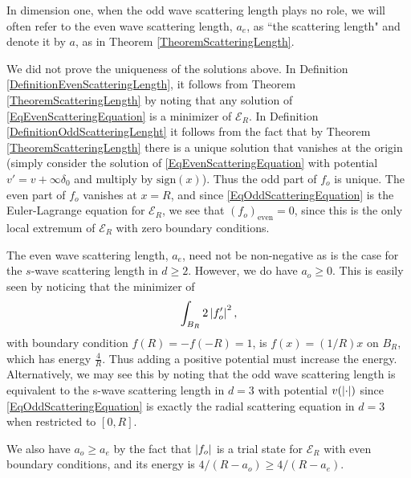 \begin{remark}
	In dimension one, when the odd wave scattering length plays no role, we will often refer to the even wave scattering length, $a_e$, as ``the scattering length" and denote it by $a$, as in Theorem \ref{TheoremScatteringLength}.
\end{remark}
\begin{remark}
	We did not prove the uniqueness of the solutions above. In Definition \ref{DefinitionEvenScatteringLength}, it follows from Theorem \ref{TheoremScatteringLength} by noting that any solution of \eqref{EqEvenScatteringEquation} is a minimizer of $ \mathcal{E}_R $. In Definition \ref{DefinitionOddScatteringLenght} it follows from the fact that by Theorem \ref{TheoremScatteringLength} there is a unique solution that vanishes at the origin (simply consider the solution of \eqref{EqEvenScatteringEquation} with potential $ v'=v+\infty \delta_0 $ and multiply by $ \text{sign}(x) $). Thus the odd part of $ f_o $ is unique. The even part of $ f_o $ vanishes at $ x=R $, and since \eqref{EqOddScatteringEquation} is the Euler-Lagrange equation for $ \mathcal{E}_R $, we see that $ (f_o)_{\text{even}}=0 $, since this is the only local extremum of $ \mathcal{E}_R $ with zero boundary conditions.
\end{remark}
\begin{remark}
	The even wave scattering length, $ a_e $, need not be non-negative as is the case for the $ s $-wave scattering length in $ d\geq 2 $. However, we do have $ a_o\geq 0 $. This is easily seen by noticing that the minimizer of \begin{equation}
	\int_{B_R} 2\left\lvert f_o' \right\rvert^2,
	\end{equation}
	with boundary condition $ f(R)=-f(-R)=1 $, is $ f(x)=(1/R) x $ on $ B_R $, which has energy $ \frac{4}{R} $. Thus adding a positive potential must increase the energy. \\
	Alternatively, we may see this by noting that the odd wave scattering length is equivalent to the s-wave scattering length in $ d=3 $ with potential $ v(\left\lvert \cdot \right\rvert) $ since 
	\eqref{EqOddScatteringEquation} is exactly the radial scattering equation in $ d=3 $ when restricted to $ [0,R] $.
\end{remark}
\begin{remark}
	We also have $ a_o\geq a_e $ by the fact that $ \left\lvert f_o \right\rvert $ is a trial state for $ \mathcal{E}_R $ with even boundary conditions, and its energy is $ 4/(R-a_o)\geq 4/(R-a_e) $.
\end{remark}
